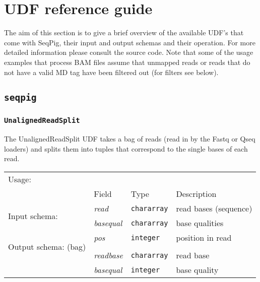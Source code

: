 
\section{UDF reference guide}
\label{sect:refguide}

\lstset{backgroundcolor=}

The aim of this section is to give a brief overview of the available
UDF's that come with SeqPig, their input and output schemas and their
operation. For more detailed information please consult the source
code. Note that some of the usage examples that process BAM files
assume that unmapped reads or reads that do not have a valid MD tag
have been filtered out (for filters see below).

\subsection{\texttt{seqpig}}

\subsubsection{\texttt{UnalignedReadSplit}}

The UnalignedReadSplit UDF takes a bag of reads (read in by the Fastq
or Qseq loaders) and splits them into tuples that correspond to the
single bases of each read.

\begin{tabular}{lp{}p{}p{}}
Usage: & \multicolumn{3}{l}{}
\hspace*{-0.55cm}\begin{minipage}{0.9\textwidth}
  \begin{lstlisting}
  reads = load 'input.fq' using FastqLoader();
  reads_by_bases = FOREACH reads GENERATE UnalignedReadSplit(sequence, quality);
  \end{lstlisting}
  \end{minipage}\hfill\kern-\arrayrulewidth
 \\[0.25cm]
& Field & Type & Description\\[0.1cm]
\multirow{2}{*}{Input schema:} & \emph{read} & \texttt{chararray} & read bases (sequence)\\
& \emph{basequal} & \texttt{chararray} & base qualities\\\hline
\multirow{3}{*}{\parbox{2.2cm}{Output schema: (bag)}} & \emph{pos} & \texttt{integer} & position in read\\\\
& \emph{readbase} & \texttt{chararray} & read base\\
& \emph{basequal} & \texttt{integer} & base quality
\end{tabular} 

